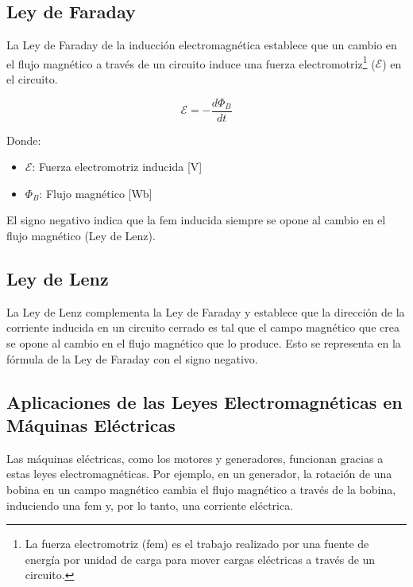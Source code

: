 \documentclass[../main]{subfiles}
\begin{document}
\subsection{Ley de Faraday}

La Ley de Faraday de la inducción electromagnética establece que un cambio en el flujo magnético a través de un circuito induce una fuerza electromotriz\footnote{La fuerza electromotriz (fem) es el trabajo realizado por una fuente de energía por unidad de carga para mover cargas eléctricas a través de un circuito.} (\(\mathcal{E}\)) en el circuito.

\begin{equation}
\mathcal{E} = -\frac{d\Phi_B}{dt}
\end{equation}

Donde:
\begin{itemize}
    \item \(\mathcal{E}\): Fuerza electromotriz inducida [V]
    \item \(\Phi_B\): Flujo magnético [Wb]
\end{itemize}

El signo negativo indica que la fem inducida siempre se opone al cambio en el flujo magnético (Ley de Lenz).

\subsection{Ley de Lenz}

La Ley de Lenz complementa la Ley de Faraday y establece que la dirección de la corriente inducida en un circuito cerrado es tal que el campo magnético que crea se opone al cambio en el flujo magnético que lo produce. Esto se representa en la fórmula de la Ley de Faraday con el signo negativo.

\subsection{Aplicaciones de las Leyes Electromagnéticas en Máquinas Eléctricas}

Las máquinas eléctricas, como los motores y generadores, funcionan gracias a estas leyes electromagnéticas. Por ejemplo, en un generador, la rotación de una bobina en un campo magnético cambia el flujo magnético a través de la bobina, induciendo una fem y, por lo tanto, una corriente eléctrica.

\end{document}
